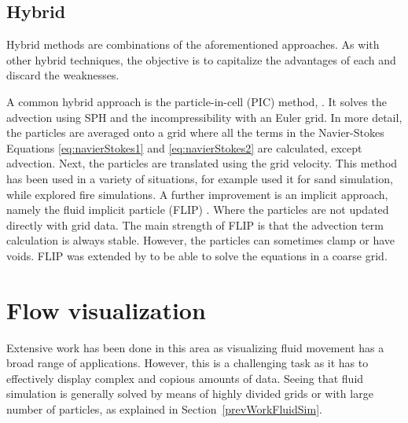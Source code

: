 \subsection{Hybrid}

Hybrid methods are combinations of the aforementioned approaches.
As with other hybrid techniques, the objective is to capitalize the advantages of each and discard the weaknesses.

A common hybrid approach is the particle-in-cell (PIC) method, \cite{Harlow1962}.
It solves the advection using SPH and the incompressibility with an Euler grid.
In more detail, the particles are averaged onto a grid where all the terms in the Navier-Stokes Equations \ref{eq:navierStokes1} and \ref{eq:navierStokes2} are calculated, except advection.
Next, the particles are translated using the grid velocity.
This method has been used in a variety of situations, for example \cite{Zhu2005} used it for sand simulation, while \cite{Horvath2009} explored fire simulations.
A further improvement is an implicit approach, namely the fluid implicit particle (FLIP) \cite{J.U.Brackbill1986}.
Where the particles are not updated directly with grid data.
The main strength of FLIP is that the advection term calculation is always stable.
However, the particles can sometimes clamp or have voids.
FLIP was extended by \cite{Raveendran2011} to be able to solve the equations in a coarse grid. 

\section{Flow visualization}
\label{sec:flowVisualization}


Extensive work has been done in this area as visualizing fluid movement has a broad range of applications.
However, this is a challenging task as it has to effectively display complex and copious amounts of data.
Seeing that fluid simulation is generally solved by means of highly divided grids or with large number of particles, as explained in Section~\ref{prevWorkFluidSim}.

